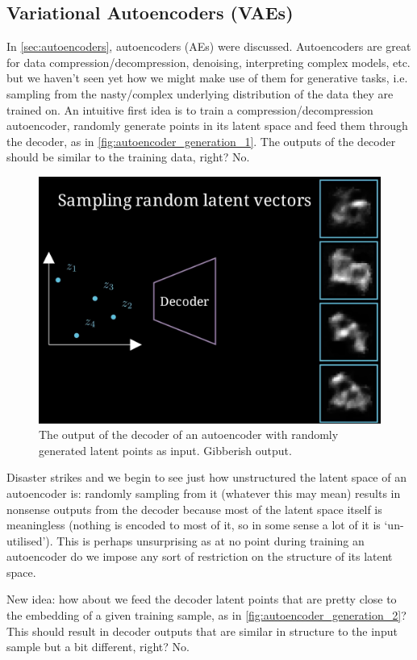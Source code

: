 \documentclass[11pt]{article}
\begin{document}
\subsection{Variational Autoencoders (VAEs)}
In \autoref{sec:autoencoders}, autoencoders (AEs) were discussed. Autoencoders are great for data compression/decompression, denoising, interpreting complex models, etc. but we haven't seen yet how we might make use of them for generative tasks, i.e. sampling from the nasty/complex underlying distribution of the data they are trained on. An intuitive first idea is to train a compression/decompression autoencoder, randomly generate points in its latent space and feed them through the decoder, as in \autoref{fig:autoencoder_generation_1}. The outputs of the decoder should be similar to the training data, right? No.

\begin{figure}[ht]
    \centering
    \includegraphics[width=0.60\columnwidth]{./figures/generative_models/AE_gen_1.png}
    \caption{The output of the decoder of an autoencoder with randomly generated latent points as input. Gibberish output.}
    \label{fig:autoencoder_generation_1}
\end{figure}

\noindent Disaster strikes and we begin to see just how unstructured the latent space of an autoencoder is: randomly sampling from it (whatever this may mean) results in nonsense outputs from the decoder because most of the latent space itself is meaningless (nothing is encoded to most of it, so in some sense a lot of it is `un-utilised'). This is perhaps unsurprising as at no point during training an autoencoder do we impose any sort of restriction on the structure of its latent space.

New idea: how about we feed the decoder latent points that are pretty close to the embedding of a given training sample, as in \autoref{fig:autoencoder_generation_2}? This should result in decoder outputs that are similar in structure to the input sample but a bit different, right? No.
\end{document}
